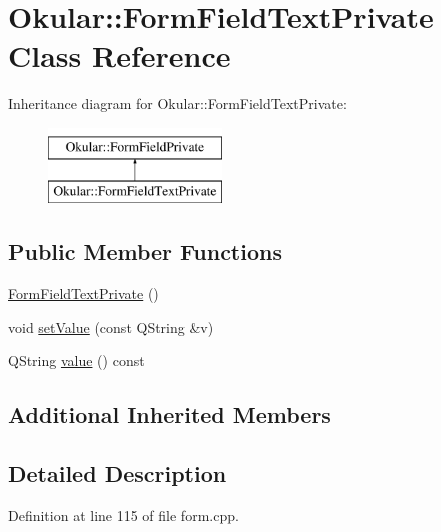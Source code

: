 \hypertarget{classOkular_1_1FormFieldTextPrivate}{\section{Okular\+:\+:Form\+Field\+Text\+Private Class Reference}
\label{classOkular_1_1FormFieldTextPrivate}
}
Inheritance diagram for Okular\+:\+:Form\+Field\+Text\+Private\+:\begin{figure}[H]
\begin{center}
\leavevmode
\includegraphics[height=2.000000cm]{classOkular_1_1FormFieldTextPrivate}
\end{center}
\end{figure}
\subsection*{Public Member Functions}
\begin{DoxyCompactItemize}
\item 
\hyperlink{classOkular_1_1FormFieldTextPrivate_a667618c333f98422f1470dbbab27b227}{Form\+Field\+Text\+Private} ()
\item 
void \hyperlink{classOkular_1_1FormFieldTextPrivate_a514b98fb764911a4074cb12e827052f2}{set\+Value} (const Q\+String \&v)
\item 
Q\+String \hyperlink{classOkular_1_1FormFieldTextPrivate_ab0c130aa8e19814cf19e3d7e4080cfa5}{value} () const 
\end{DoxyCompactItemize}
\subsection*{Additional Inherited Members}


\subsection{Detailed Description}


Definition at line 115 of file form.\+cpp.



